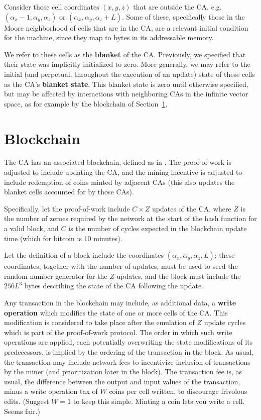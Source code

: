 \documentclass{article}
\begin{document}
Consider those cell coordinates $(x,y,z)$ that are outside the CA,
e.g. $(\alpha_x-1,\alpha_y,\alpha_z)$ or  $(\alpha_x,\alpha_y,\alpha_z + L)$.
Some of these, specifically those in the Moore neighborhood of cells that are in the CA,
are a relevant initial condition for the machine,
since they map to bytes in its addressable memory.

We refer to these cells as the {\bf blanket} of the CA.
Previously, we specified that their state was implicitly initialized to zero.
More generally, we may refer to the initial (and perpetual, throughout the execution of an update)
state of these cells as the CA's {\bf blanket state}.
This blanket state is zero until otherwise specified, but may be affected
by interactions with neighboring CAs in the infinite vector space,
as for example by the blockchain of Section~\ref{sec:Blockchain}.

\section{Blockchain}
\label{sec:Blockchain}

The CA has an associated blockchain, defined as in \cite{Nakamoto2008}.
The proof-of-work is adjusted to include updating the CA,
and the mining incentive is adjusted to include redemption of coins minted by adjacent CAs
(this also updates the blanket cells accounted for by those CAs).

Specifically, let the proof-of-work include $C \times Z$ updates of the CA,
where $Z$ is the number of zeroes required by the network at the start of the hash function for a valid block,
and $C$ is the number of cycles expected in the blockchain update time
(which for bitcoin is 10 minutes).

Let the definition of a block include the coordinates $(\alpha_x,\alpha_y,\alpha_z,L)$;
these coordinates, together with the number of updates,
must be used to seed the random number generator for the $Z$ updates,
and the block must include the $256 L^3$ bytes describing the state of the CA following the update.

Any transaction in the blockchain may include, as additional data,
a {\bf write operation} which modifies the state of one or more cells of the CA.
This modification is considered to take place after the emulation of $Z$ update cycles
which is part of the proof-of-work protocol.
The order in which such write operations are applied,
each potentially overwriting the state modifications of its predecessors,
is implied by the ordering of the transaction in the block.
As usual, the transaction may include network fees to incentivize inclusion of transactions
by the miner
(and prioritization later in the block).
The transaction fee is, as usual, the difference between the output and input values of the transaction,
minus a write operation tax of $W$ coins per cell written,
to discourage frivolous edits.
(Suggest $W=1$ to keep this simple.
Minting a coin lets you write a cell.
Seems fair.)
\end{document}
